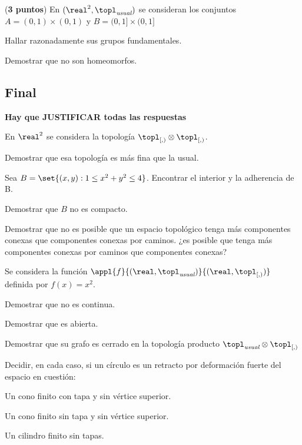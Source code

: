 \begin{problem} ({\bf 3 puntos}) En $(\real^2, \topl_{\textit{usual}})$ se consideran los conjuntos ${A = (0,1) \times (0,1) }$ y ${B = (0,1] \times (0,1] }$

\ppart Hallar razonadamente sus grupos fundamentales.

\ppart Demostrar que no son homeomorfos.

\solution
\end{problem}

\newpage
\subsection{Final}
{\bf Hay que JUSTIFICAR todas las respuestas}

\begin{problem}
En $\real^2$ se considera la topología $\topl_{[,)} \otimes \topl_{[,)}$.

\ppart Demostrar que esa topología es más fina que la usual.

\ppart Sea ${B = \set{(x,y) : 1\leq x^2 + y^2 \leq 4} }$. Encontrar el interior y la adherencia de B.

\ppart Demostrar que $B$ no es compacto.

\solution
\end{problem}


\begin{problem}
Demostrar que no es posible que un espacio topológico tenga más componentes conexas que componentes conexas por caminos. ¿es posible que tenga más componentes conexas por caminos que componentes conexas?

\solution
\end{problem}


\begin{problem}
Se considera la función $\appl{f}{(\real,\topl_{\textit{usual}})}{(\real,\topl_{[,)})}$ definida por ${f(x) = x^2 }$.

\ppart Demostrar que no es continua.

\ppart Demostrar que es abierta.

\ppart Demostrar que su grafo es cerrado en la topología producto ${\topl_{\textit{usual}} \otimes \topl_{[,)}}$
\solution
\end{problem}


\begin{problem}
Decidir, en cada caso, si un círculo es un retracto por deformación fuerte del espacio en cuestión:

\ppart Un cono finito con tapa y sin vértice superior.

\ppart Un cono finito sin tapa y sin vértice superior.

\ppart Un cilindro finito sin tapas.
\solution
\end{problem}
